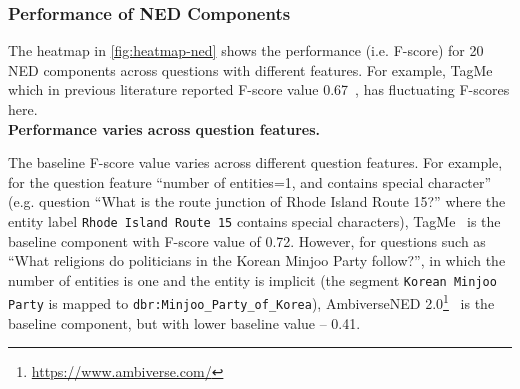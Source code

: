 \documentclass[sigconf,edbt]{acmart-edbt2019}
\newcommand{\qq}[1]{``#1''}
\begin{document}
\subsubsection{Performance of NED Components} \label{sec:nedc}
The heatmap in \autoref{fig:heatmap-ned} shows the performance (i.e. F-score) for 20 NED components across questions with different features.
For example, TagMe~\cite{DBLP:conf/cikm/FerraginaS10} which in previous literature reported F-score value 0.67~\cite{DBLP:conf/www/SinghRBSLUVKP0V18}, has fluctuating F-scores here.
~\\
{\bf Performance varies across question features.} \begin{inparaenum}
The baseline F-score value varies across different question features. For example, for the question feature ``number of entities=1, and contains special character'' (e.g. question \qq{What is the route junction of Rhode Island Route 15?} where the entity label \texttt{Rhode Island Route 15} contains special characters), TagMe~\cite{DBLP:conf/cikm/FerraginaS10} is the baseline component with F-score value of 0.72. However, for questions such as \qq{What religions do politicians in the Korean Minjoo Party follow?}, in which the number of entities is one and the entity is implicit (the segment \texttt{Korean Minjoo Party} is mapped to \texttt{dbr:Minjoo\_Party\_of\_Korea}), AmbiverseNED 2.0\footnote{\url{https://www.ambiverse.com/}}~\cite{DBLP:conf/emnlp/HoffartYBFPSTTW11} is the baseline component, but with lower baseline value -- 0.41.
\end{inparaenum}
\end{document}
